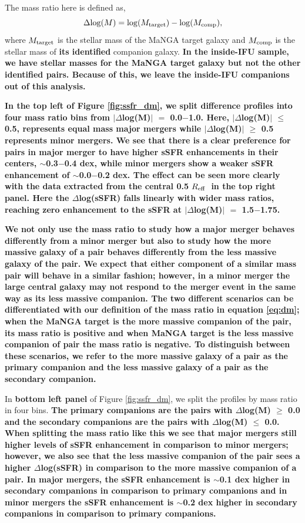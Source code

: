 \documentclass[iop,revtex4,twocolumn,apj,numberedappendix,appendixfloats]{emulateapj}
\newcommand{\reff}{$R_{\rm eff}$}
\begin{document}
The mass ratio here is defined as, 
\begin{equation}\label{eq:dm}
\Delta {\rm log}(M) = {\rm log}(M_{\rm target}) - {\rm log}(M_{\rm comp}),
\end{equation}
where $M_{\rm target}$ is the stellar mass of the MaNGA target galaxy and $M_{\rm comp}$ is the stellar mass of \textbf{its identified} companion galaxy. \textbf{In the inside-IFU sample, we have stellar masses for the MaNGA target galaxy but not the other identified pairs. Because of this, we leave the inside-IFU companions out of this analysis.}

\textbf{In the top left of Figure \ref{fig:ssfr_dm}, we split difference profiles into four mass ratio bins from $|\Delta$log(M)$|$ $=$ 0.0$-$1.0. Here, $|\Delta$log(M)$|$ $\le$ 0.5, represents equal mass major mergers while $|\Delta$log(M)$|$ $\ge$ 0.5 represents minor mergers. We see that there is a clear preference for pairs in major merger to have higher sSFR enhancements in their centers, $\sim$0.3$-$0.4 dex, while minor mergers show a weaker sSFR enhancement of $\sim$0.0$-$0.2 dex. The effect can be seen more clearly with the data extracted from the central 0.5 \reff\ in the top right panel. Here the $\Delta$log(sSFR) falls linearly with wider mass ratios, reaching zero enhancement to the sSFR at $|\Delta$log(M)$|$ $=$ 1.5$-$1.75.}

\textbf{We not only use the mass ratio to study how a major merger behaves differently from a minor merger but also to study how the more massive galaxy of a pair behaves differently from the less massive galaxy of the pair. We expect that either component of a similar mass pair will behave in a similar fashion; however, in a minor merger the large central galaxy may not respond to the merger event in the same way as its less massive companion. The two different scenarios can be differentiated with our definition of the mass ratio in equation \ref{eq:dm}; when the MaNGA target is the more massive companion of the pair, its mass ratio is positive and when MaNGA target is the less massive companion of pair the mass ratio is negative. To distinguish between these scenarios, we refer to the more massive galaxy of a pair as the primary companion and the less massive galaxy of a pair as the secondary companion.}

In \textbf{bottom left panel} of Figure \ref{fig:ssfr_dm}, we split the profiles by mass ratio in four bins. \textbf{The primary companions are the pairs with $\Delta$log(M) $\ge$ 0.0 and the secondary companions are the pairs with $\Delta$log(M) $\le$ 0.0. When splitting the mass ratio like this we see that major mergers still higher levels of sSFR enhancement in comparison to minor mergers; however, we also see that the less massive companion of the pair sees a higher $\Delta$log(sSFR) in comparison to the more massive companion of a pair. In major mergers, the sSFR enhancement is $\sim$0.1 dex higher in secondary companions in comparison to primary companions and in minor mergers the sSFR enhancement is $\sim$0.2 dex higher in secondary companions in comparison to primary companions.}
\end{document}
